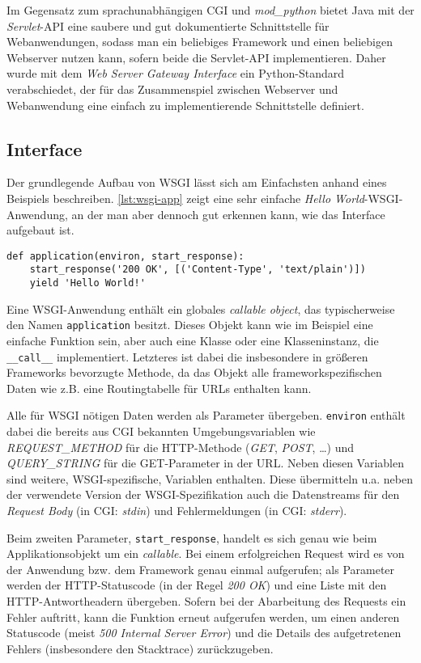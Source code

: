 Im Gegensatz zum sprachunabhängigen CGI und \emph{mod\_python} bietet Java mit der \emph{Servlet}-API
eine saubere und gut dokumentierte Schnittstelle für Webanwendungen, sodass man ein beliebiges
Framework und einen beliebigen Webserver nutzen kann, sofern beide die Servlet-API implementieren.
Daher wurde mit dem \emph{Web Server Gateway Interface} ein Python-Standard verabschiedet, der für
das Zusammenspiel zwischen Webserver und Webanwendung eine einfach zu implementierende Schnittstelle
definiert.


\subsection{Interface}\label{wsgi-interface}

Der grundlegende Aufbau von WSGI lässt sich am Einfachsten anhand eines Beispiels beschreiben.
\autoref{lst:wsgi-app} zeigt eine sehr einfache \emph{Hello World}-WSGI-Anwendung, an der man aber
dennoch gut erkennen kann, wie das Interface aufgebaut ist.

\begin{lstlisting}[caption=Einfache WSGI-Applikation,label=lst:wsgi-app]
def application(environ, start_response):
    start_response('200 OK', [('Content-Type', 'text/plain')])
    yield 'Hello World!'
\end{lstlisting}

Eine WSGI-Anwendung enthält ein globales \emph{callable object}, das typischerweise den Namen
\lstinline{application} besitzt. Dieses Objekt kann wie im Beispiel eine einfache Funktion sein,
aber auch eine Klasse oder eine Klasseninstanz, die \lstinline{__call__} implementiert. Letzteres
ist dabei die insbesondere in größeren Frameworks bevorzugte Methode, da das Objekt alle
frameworkspezifischen Daten wie z.B. eine Routingtabelle für URLs enthalten kann.

Alle für WSGI nötigen Daten werden als Parameter übergeben. \lstinline{environ} enthält dabei die
bereits aus CGI bekannten Umgebungsvariablen wie \emph{REQUEST\_METHOD} für die HTTP-Methode
(\emph{GET}, \emph{POST}, \ldots) und \emph{QUERY\_STRING} für die GET-Parameter in der URL. Neben
diesen Variablen sind weitere, WSGI-spezifische, Variablen enthalten. Diese übermitteln u.a. neben
der verwendete Version der WSGI-Spezifikation auch die Datenstreams für den
\emph{Request Body} (in CGI: \emph{stdin}) und Fehlermeldungen (in CGI: \emph{stderr}).

Beim zweiten Parameter, \lstinline{start_response}, handelt es sich genau wie beim
Applikationsobjekt um ein \emph{callable}. Bei einem erfolgreichen Request wird es von der Anwendung
bzw. dem Framework genau einmal aufgerufen; als Parameter werden der HTTP-Statuscode (in der
Regel \emph{200 OK}) und eine Liste mit den HTTP-Antwortheadern übergeben. Sofern bei der
Abarbeitung des Requests ein Fehler auftritt, kann die Funktion erneut aufgerufen werden, um einen
anderen Statuscode (meist \emph{500 Internal Server Error}) und die Details des aufgetretenen
Fehlers (insbesondere den Stacktrace) zurückzugeben.

